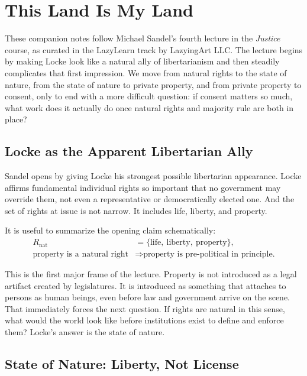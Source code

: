 \chapter{This Land Is My Land}

These companion notes follow Michael Sandel's fourth lecture in the \textit{Justice} course, as curated in the LazyLearn track by LazyingArt LLC. The lecture begins by making Locke look like a natural ally of libertarianism and then steadily complicates that first impression. We move from natural rights to the state of nature, from the state of nature to private property, and from private property to consent, only to end with a more difficult question: if consent matters so much, what work does it actually do once natural rights and majority rule are both in place?

\section{Locke as the Apparent Libertarian Ally}

Sandel opens by giving Locke his strongest possible libertarian appearance. Locke affirms fundamental individual rights so important that no government may override them, not even a representative or democratically elected one. And the set of rights at issue is not narrow. It includes life, liberty, and property.

It is useful to summarize the opening claim schematically:
\begin{align}
R_{\mathrm{nat}} &= \{\text{life},\ \text{liberty},\ \text{property}\},\\
\text{property is a natural right} &\Longrightarrow \text{property is pre-political in principle.}
\end{align}

This is the first major frame of the lecture. Property is not introduced as a legal artifact created by legislatures. It is introduced as something that attaches to persons as human beings, even before law and government arrive on the scene. That immediately forces the next question. If rights are natural in this sense, what would the world look like before institutions exist to define and enforce them? Locke's answer is the state of nature.

\section{State of Nature: Liberty, Not License}

